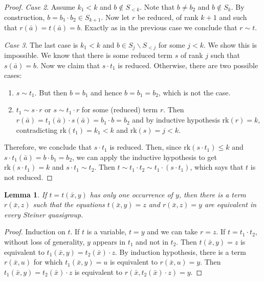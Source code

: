 \documentclass[10pt,a4paper]{article}
\newcommand{\rk}{\mathrm{rk}}
\theoremstyle{note}
\newtheorem{lemma}[thm]{Lemma}
\begin{document}
\begin{proof}
		\emph{Case 2}. Assume $k_1 <k$ and $b\not \in S_{<k}$.  Note that $b\neq b_2$ and $b\not \in S_k$. By construction, $b= b_1\cdot b_2 \in S_{k+1}$.  Now let $r$ be reduced, of rank $k+1$ and such that $r(\bar{a})= t(\bar{a})=b$. Exactly as in the previous case we conclude that $r\sim t$.
		
		\emph{Case 3}. The last case is $k_1 < k$ and  $b\in S_j\smallsetminus S_{<j}$  for some $j<k$.  We show this is impossible.   We know that there is some reduced term $s$ of rank $j$ such that $s(\bar{a}) = b$. Now we claim that $s\cdot t_1$ is reduced. Otherwise, there are two possible cases:
		\begin{enumerate}
			\item[(i)] $s\sim t_1$.  But then $b= b_1$ and hence $b=b_1 = b_2$, which is not the case.
			\item[(ii)]  $t_1\sim s\cdot r$ or $s\sim t_1\cdot r$  for some (reduced)  term $r$.  Then $r(\bar{a})= t_1(\bar{a})\cdot s(\bar{a})= b_1\cdot b= b_2$  and by inductive hypothesis $\rk(r)=k$, contradicting $\rk(t_1)=k_1<k$ and $\rk(s)= j<k$.
		\end{enumerate}
		Therefore, we conclude that $s\cdot t_1$ is reduced. Then, since $\rk(s\cdot t_1)\leq k$ and $s\cdot  t_1 (\bar{a}) = b\cdot b_1 = b_2$, we can apply the inductive hypothesis to get $\rk(s\cdot t_1)= k$  and  $s\cdot t_1\sim t_2$. Then $t\sim t_1\cdot t_2\sim t_1\cdot (s\cdot t_1)$, which says that $t$ is not reduced.
	\end{proof}

	\begin{lemma}\label{June9_2} If $t= t(\bar{x},y)$ has only one occurrence of $y$, then there is a term $r(\bar{x},z)$  such that the equations  $t(\bar{x},y)= z$   and   $r(\bar{x},z)= y$  are equivalent in every Steiner quasigroup.
	\end{lemma}
	\begin{proof} Induction on $t$.  If $t$ is a variable, $t= y$  and we can take  $r= z$.  If $t=t_1\cdot t_2$, without loss of generality, $y$ appears in $t_1$ and not in $t_2$. Then $t(\bar{x},y)=z$ is equivalent to  $t_1(\bar{x},y)= t_2(\bar{x})\cdot z$. By induction hypothesis, there is a term $r(\bar{x},u)$  for which  $t_1(\bar{x},y)= u$  is equivalent to  $r(\bar{x},u)= y$.  Then  $t_1(\bar{x},y)= t_2(\bar{x})\cdot z$  is equivalent to  $r(\bar{x},t_2(\bar{x})\cdot z)= y$.
	\end{proof}
	
\end{document}
